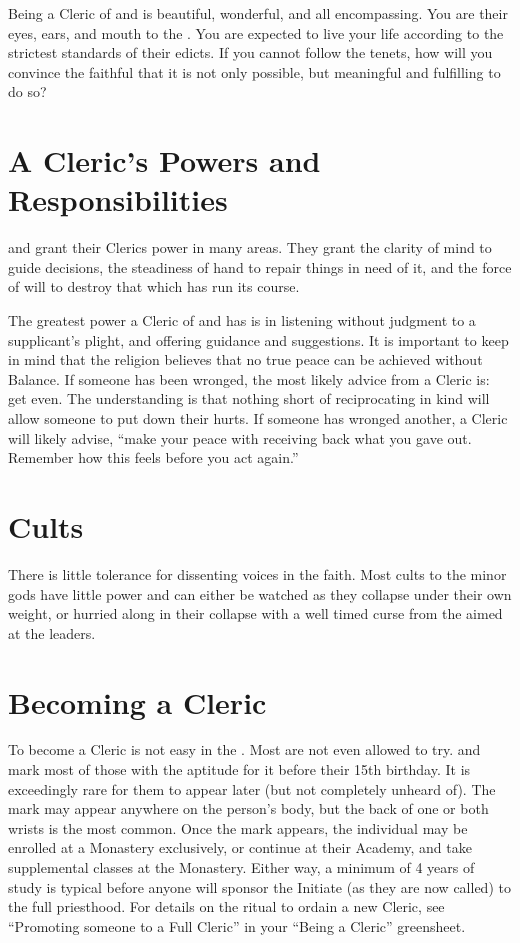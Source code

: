 \documentclass[blue]{GL2020}
\begin{document}
\name{\bLeauCleric{}}

Being a Cleric of \cEbbFull{\full} and \cFlowFull{\full} is beautiful, wonderful, and all encompassing. You are their eyes, ears, and mouth to the \pShippies{}. You are expected to live your life according to the strictest standards of their edicts. If you cannot follow the tenets, how will you convince the faithful that it is not only possible, but meaningful and fulfilling to do so?

\section*{A Cleric's Powers and Responsibilities}
\cEbb{} and \cFlow{} grant their Clerics power in many areas. They grant the clarity of mind to guide decisions, the steadiness of hand to repair things in need of it, and the force of will to destroy that which has run its course. 

The greatest power a Cleric of \cEbb{} and \cFlow{} has is in listening without judgment to a supplicant's plight, and offering guidance and suggestions. It is important to keep in mind that the \pShip{} religion believes that no true peace can be achieved without Balance. If someone has been wronged, the most likely advice from a Cleric is: get even. The understanding is that nothing short of reciprocating in kind will allow someone to put down their hurts. If someone has wronged another, a Cleric will likely advise, ``make your peace with receiving back what you gave out. Remember how this feels before you act again.''

\section*{Cults}
There is little tolerance for dissenting voices in the faith. Most cults to the minor gods have little power and can either be watched as they collapse under their own weight, or hurried along in their collapse with a well timed curse from the \pFarmers{} aimed at the leaders.

\section*{Becoming a Cleric}
To become a Cleric is not easy in the \pShip{}. Most are not even allowed to try. \cEbb{} and \cFlow{} mark most of those with the aptitude for it before their 15th birthday. It is exceedingly rare for them to appear later (but not completely unheard of). The mark may appear anywhere on the person’s body, but the back of one or both wrists is the most common. Once the mark appears, the individual may be enrolled at a Monastery exclusively, or continue at their Academy, and take supplemental classes at the Monastery. Either way, a minimum of 4 years of study is typical before anyone will sponsor the Initiate (as they are now called) to the full priesthood. For details on the ritual to ordain a new Cleric, see ``Promoting someone to a Full Cleric'' in your ``Being a Cleric'' greensheet.
\end{document}
